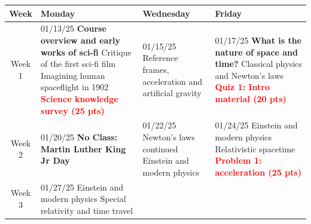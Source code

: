 \documentclass[11pt]{article}
\begin{document}

\begin{tabularx}{\textwidth}{|c|X|X|X|}
    \hline
    \textbf{Week} & \textbf{Monday} & \textbf{Wednesday} & \textbf{Friday} \\
    \hline
    Week 1 & 
    
    01/13/25 \newline
    \textbf{Course overview and early works of sci-fi} \newline
    Critique of the first sci-fi film \newline
    Imagining human spaceflight in 1902\newline
    \textcolor{red}{\textbf{Science knowledge survey (25 pts)}} &
    
    01/15/25 \newline
    \newline
    Reference frames, acceleration and \newline
    artificial gravity &

    01/17/25 \newline
    \textbf{What is the nature of space and time?} \newline
    Classical physics and Newton's laws \newline
    \newline
    \textcolor{red}{\textbf{Quiz 1: Intro material (20 pts)}} \\


    \hline
    Week 2 & 

    \cellcolor{gray!20}01/20/25 \newline
    \newline
    \textbf{No Class: Martin Luther King Jr Day}
    &
    
    01/22/25 \newline
    \newline
    Newton's laws continued \newline
    Einstein and modern physics &

    01/24/25  \newline
    \newline
    Einstein and modern physics \newline
    Relativistic spacetime \newline
    \textcolor{red}{\textbf{Problem 1: acceleration (25 pts)}} \\


    \hline
    Week 3 & 

    01/27/25 \newline
    \newline
    Einstein and modern physics \newline
    Special relativity and time travel &
    

\end{tabularx}
\end{document}
